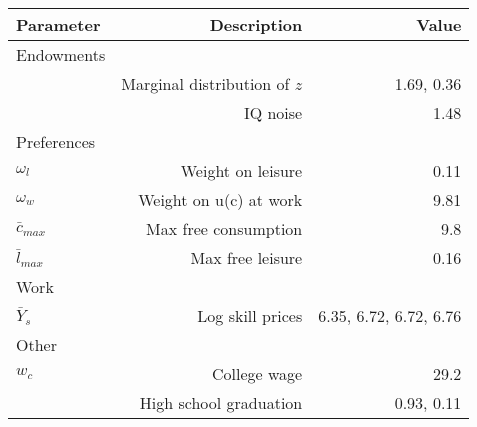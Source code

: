 \begin{tabular}{lrr}
\hline
Parameter & Description  & Value  \\ 
\hline
Endowments &   &   \\ 
 & Marginal distribution of $z$  & 1.69, 0.36  \\ 
 & IQ noise  & 1.48  \\ 
Preferences &   &   \\ 
$\omega_{l}$ & Weight on leisure  & 0.11  \\ 
$\omega_{w}$ & Weight on u(c) at work  & 9.81  \\ 
$\bar{c}_{max}$ & Max free consumption  & 9.8  \\ 
$\bar{l}_{max}$ & Max free leisure  & 0.16  \\ 
Work &   &   \\ 
$\bar{Y}_{s}$ & Log skill prices  & 6.35, 6.72, 6.72, 6.76  \\ 
Other &   &   \\ 
$w_{c}$ & College wage  & 29.2  \\ 
 & High school graduation  & 0.93, 0.11  \\ 
\hline
\end{tabular}%
